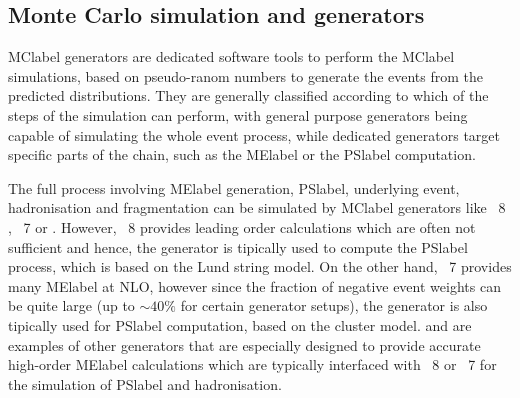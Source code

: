 \subsection{Monte Carlo simulation and generators}

\acrshort{MClabel} generators are dedicated software tools to perform the \acrshort{MClabel} simulations, based on pseudo-ranom numbers to generate the events from the predicted distributions. They are generally classified according to which of the steps of the simulation can perform, with general purpose generators being capable of simulating the whole event process, while dedicated generators target specific parts of the chain, such as the \acrshort{MElabel} or the \acrshort{PSlabel} computation.

The full process involving \acrshort{MElabel} generation, \acrshort{PSlabel}, underlying event, hadronisation and fragmentation can be simulated by \acrshort{MClabel} generators like \PYTHIA~8 %
, \HERWIG~7 %
or \SHERPA %
. However, \PYTHIA~8 provides leading order calculations which are often not
sufficient and hence, the generator is tipically used to compute the \acrshort{PSlabel} process, which is based on the Lund string model. On the other hand, \HERWIG~7 provides many \acrshort{MElabel} at NLO, however since the fraction of negative event weights can be quite large (up to $\sim40\%$ for certain generator setups), the generator is also tipically used for \acrshort{PSlabel} computation, based on the cluster model. \POWHEGBOX %
and \MGMCatNLO %
are examples of other generators that are especially designed to provide accurate high-order \acrshort{MElabel} calculations which are typically interfaced with \PYTHIA~8 or \HERWIG~7 for the simulation of \acrshort{PSlabel} and hadronisation. 

